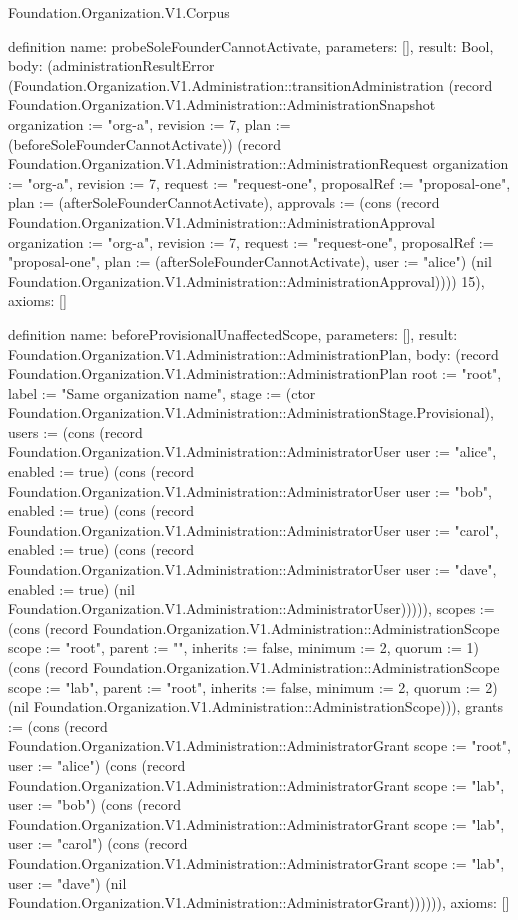 \begin{lexlean}{Foundation.Organization.V1.Corpus}
\begin{semanticmodule}
definition{
  name: probeSoleFounderCannotActivate,
  parameters: [],
  result: Bool,
  body: (administrationResultError (Foundation.Organization.V1.Administration::transitionAdministration (record Foundation.Organization.V1.Administration::AdministrationSnapshot {organization := "org-a", revision := 7, plan := (beforeSoleFounderCannotActivate)}) (record Foundation.Organization.V1.Administration::AdministrationRequest {organization := "org-a", revision := 7, request := "request-one", proposalRef := "proposal-one", plan := (afterSoleFounderCannotActivate), approvals := (cons (record Foundation.Organization.V1.Administration::AdministrationApproval {organization := "org-a", revision := 7, request := "request-one", proposalRef := "proposal-one", plan := (afterSoleFounderCannotActivate), user := "alice"}) (nil Foundation.Organization.V1.Administration::AdministrationApproval))})) 15),
  axioms: []
}

definition{
  name: beforeProvisionalUnaffectedScope,
  parameters: [],
  result: Foundation.Organization.V1.Administration::AdministrationPlan,
  body: (record Foundation.Organization.V1.Administration::AdministrationPlan {root := "root", label := "Same organization name", stage := (ctor Foundation.Organization.V1.Administration::AdministrationStage.Provisional), users := (cons (record Foundation.Organization.V1.Administration::AdministratorUser {user := "alice", enabled := true}) (cons (record Foundation.Organization.V1.Administration::AdministratorUser {user := "bob", enabled := true}) (cons (record Foundation.Organization.V1.Administration::AdministratorUser {user := "carol", enabled := true}) (cons (record Foundation.Organization.V1.Administration::AdministratorUser {user := "dave", enabled := true}) (nil Foundation.Organization.V1.Administration::AdministratorUser))))), scopes := (cons (record Foundation.Organization.V1.Administration::AdministrationScope {scope := "root", parent := "", inherits := false, minimum := 2, quorum := 1}) (cons (record Foundation.Organization.V1.Administration::AdministrationScope {scope := "lab", parent := "root", inherits := false, minimum := 2, quorum := 2}) (nil Foundation.Organization.V1.Administration::AdministrationScope))), grants := (cons (record Foundation.Organization.V1.Administration::AdministratorGrant {scope := "root", user := "alice"}) (cons (record Foundation.Organization.V1.Administration::AdministratorGrant {scope := "lab", user := "bob"}) (cons (record Foundation.Organization.V1.Administration::AdministratorGrant {scope := "lab", user := "carol"}) (cons (record Foundation.Organization.V1.Administration::AdministratorGrant {scope := "lab", user := "dave"}) (nil Foundation.Organization.V1.Administration::AdministratorGrant)))))}),
  axioms: []
}


\end{semanticmodule}
\end{lexlean}
